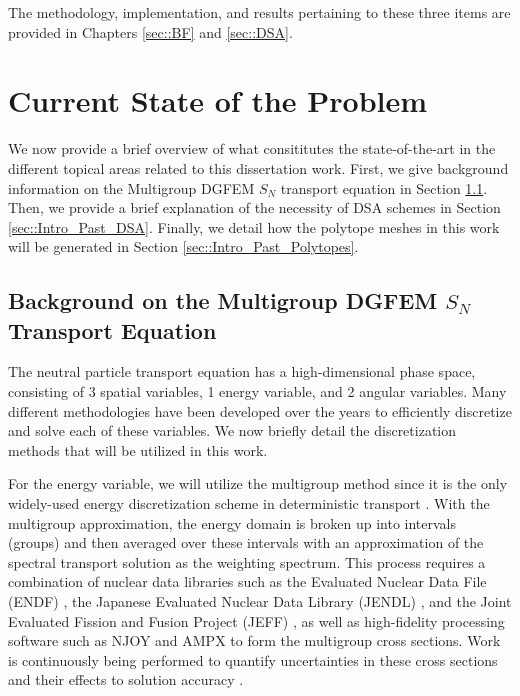 \noindent The methodology, implementation, and results pertaining to these three items are provided in Chapters \ref{sec::BF} and \ref{sec::DSA}.

\section{Current State of the Problem}
\label{sec::Intro_Past}

We now provide a brief overview of what consititutes the state-of-the-art in the different topical areas related to this dissertation work. First, we give background information on the Multigroup DGFEM $S_N$ transport equation in Section \ref{sec::Intro_Past_DGFEMMGSn}. Then, we provide a brief explanation of the necessity of DSA schemes in Section \ref{sec::Intro_Past_DSA}. Finally, we detail how the polytope meshes in this work will be generated in Section \ref{sec::Intro_Past_Polytopes}.

\subsection{Background on the Multigroup DGFEM $S_N$ Transport Equation}
\label{sec::Intro_Past_DGFEMMGSn}

The neutral particle transport equation has a high-dimensional phase space, consisting of 3 spatial variables, 1 energy variable, and 2 angular variables. Many different methodologies have been developed over the years to efficiently discretize and solve each of these variables. We now briefly detail the discretization methods that will be utilized in this work.

For the energy variable, we will utilize the multigroup method since it is the only widely-used energy discretization scheme in deterministic transport \cite{duderstadt1976nuclear,bell1979nuclear}. With the multigroup approximation, the energy domain is broken up into intervals (groups) and then averaged over these intervals with an approximation of the spectral transport solution as the weighting spectrum. This process requires a combination of nuclear data libraries such as the Evaluated Nuclear Data File (ENDF) \cite{chadwick2006endf,chadwick2011endf}, the Japanese Evaluated Nuclear Data Library (JENDL) \cite{shibata2002japanese}, and the Joint Evaluated Fission and Fusion Project (JEFF) \cite{koning2006jeff}, as well as high-fidelity processing software such as NJOY \cite{macfarlane2002njoy,kahler2012njoy} and AMPX \cite{dunn2002ampx} to form the multigroup cross sections. Work is continuously being performed to quantify uncertainties in these cross sections and their effects to solution accuracy \cite{aliberti2006nuclear,jessee2008cross}.

